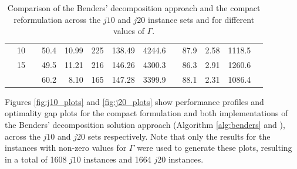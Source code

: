 \documentclass[a4paper,abstracton]{scrartcl}
\begin{document}
\begin{table}[h]
{\begin{tabular}{lrrrrrrrrrrrr}
			       & 10   & & 50.4     & 10.99    & 225          & 138.49        & 4244.6       & & 87.9       & 2.58       & 1118.5          \\
			       & 15   & & 49.5     & 11.21    & 216          & 146.26        & 4300.3       & & 86.3       & 2.91       & 1260.6          \\
		     \cline{4-8} \cline{10-12}
			       &      & & 60.2	   & 8.10     & 165	     & 147.28	     & 3399.9       & & 88.1       & 2.31       & 1086.4          \\
		     \hline \hline
\end{tabular}
}
\caption{Comparison of the Benders' decomposition approach and the compact reformulation across the $j10$ and $j20$ instance sets and for different values of $\Gamma$.}
\label{table:benders_vs_compact}
\end{table}

Figures \ref{fig:j10_plots} and \ref{fig:j20_plots} show performance profiles and optimality gap plots for the compact formulation and both implementations of the Benders' decomposition solution approach (Algorithm \ref{alg:benders} and \cite{balouka2021robust}), across the $j10$ and $j20$ sets respectively. Note that only the results for the instances with non-zero values for $\Gamma$ were used to generate these plots, resulting in a total of 1608 $j10$ instances and 1664 $j20$ instances. 
\end{document}
